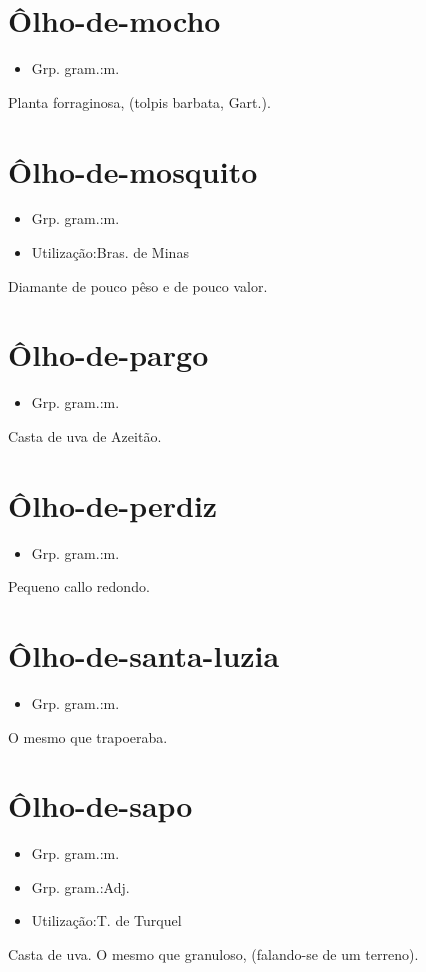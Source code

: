\section{Ôlho-de-mocho}
\begin{itemize}
\item {Grp. gram.:m.}
\end{itemize}
Planta forraginosa, (\textunderscore tolpis barbata\textunderscore , Gart.).
\section{Ôlho-de-mosquito}
\begin{itemize}
\item {Grp. gram.:m.}
\end{itemize}
\begin{itemize}
\item {Utilização:Bras. de Minas}
\end{itemize}
Diamante de pouco pêso e de pouco valor.
\section{Ôlho-de-pargo}
\begin{itemize}
\item {Grp. gram.:m.}
\end{itemize}
Casta de uva de Azeitão.
\section{Ôlho-de-perdiz}
\begin{itemize}
\item {Grp. gram.:m.}
\end{itemize}
Pequeno callo redondo.
\section{Ôlho-de-santa-luzia}
\begin{itemize}
\item {Grp. gram.:m.}
\end{itemize}
O mesmo que \textunderscore trapoeraba\textunderscore .
\section{Ôlho-de-sapo}
\begin{itemize}
\item {Grp. gram.:m.}
\end{itemize}
\begin{itemize}
\item {Grp. gram.:Adj.}
\end{itemize}
\begin{itemize}
\item {Utilização:T. de Turquel}
\end{itemize}
Casta de uva.
O mesmo que \textunderscore granuloso\textunderscore , (falando-se de um terreno).
